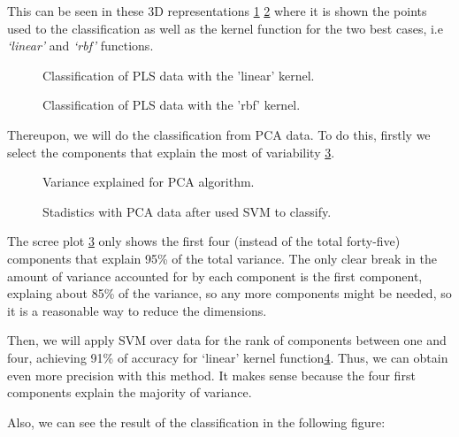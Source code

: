 This can be seen in these 3D representations \ref{fig:Classification3D_PLS_linear} \ref{fig:Classification3D_PLS_rbf} where it is shown the points used to the classification as well as the kernel function for the two best cases, i.e \textit{‘linear’} and \textit{‘rbf’} functions.

\begin{figure}[H]
	\centering
	\caption{Classification of PLS data with the 'linear' kernel.}
	\label{fig:Classification3D_PLS_linear}
\end{figure}

\begin{figure}[H]
	\centering
	\caption{Classification of PLS data with the 'rbf' kernel.}
	\label{fig:Classification3D_PLS_rbf}
\end{figure}

Thereupon, we will do the classification from PCA data. To do this, firstly we select the components that explain the most of variability \ref{fig:variance_PCA}.

\begin{figure}[H]
	\centering
	\caption{Variance explained for PCA algorithm.}
	\label{fig:variance_PCA}
\end{figure} 

\begin{figure}[H]
	\centering
	\caption{Stadistics with PCA data after used SVM to classify.}
	\label{fig:stadistics_PCA}
	\end{figure}
The scree plot \ref{fig:variance_PCA} only shows the first four (instead of the total forty-five) components that explain 95\% of the total variance. The only clear break in the amount of variance accounted for by each component is the first component, explaing about 85\% of the variance, so any more components might be needed, so it is  a reasonable way to reduce the dimensions.

Then, we will apply SVM over data for the rank of components between one and four, achieving 91\% of accuracy for ‘linear’ kernel function\ref{fig:stadistics_PCA}. Thus, we can obtain even more precision with this method. It makes sense because the four first components explain the majority of variance.

Also, we can see the result of the classification in the following figure:

